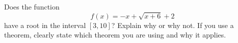 \documentclass[addpoints,12pt]{exam}
\begin{document}
\begin{questions}
\begin{center}

\end{center}



\vfill

\newpage

\question[6] Does the function $$f(x) = -x + \sqrt{x + 6} +2 $$ have a root in the interval $[3 , 10
]$? Explain why or why not. If you use a theorem, clearly state which theorem you are using and
why it applies.


\newpage















\end{questions}
\end{document}

